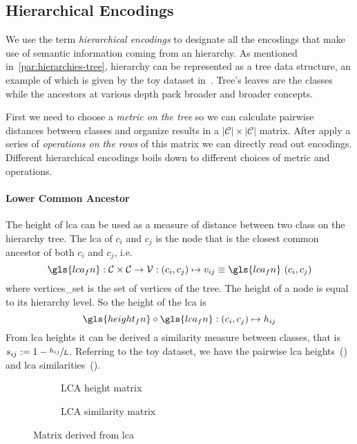\subsection{Hierarchical Encodings}
\label{subsec:hierarchical-encodings}
We use the term \emph{hierarchical encodings} to designate all the encodings
that make use of semantic information coming from an hierarchy. As mentioned
in~\cref{par:hierarchies-tree}, hierarchy can be represented as a tree data
structure, an example of which is given by the toy dataset
in~. Tree's leaves are the classes while the ancestors
at various depth pack broader and broader concepts.

First we need to choose a \emph{metric on the tree} so we can calculate
pairwise distances between classes and organize results in a $|\mathcal{C}|
\times |\mathcal{C}|$ matrix. After apply a series of \emph{operations on the
rows} of this matrix we can directly read out encodings. Different hierarchical
encodings boils down to different choices of metric and operations.

\paragraph{Lower Common Ancestor}
The height of \acrfull{lca} can be used as a measure of distance between two
class on the hierarchy tree. The \acrshort{lca} of $c_i$ and $c_j$ is the node
that is the closest common ancestor of both $c_i$ and $c_j$, i.e.
\begin{equation}
  \gls{lca_fn} : \mathcal{C} \times \mathcal{C} \to \mathcal{V}:
  \left(c_i, c_j\right) \mapsto v_{ij} \equiv
  \gls{lca_fn} \, \left(c_i, c_j\right)
  \label{eq:lca}
\end{equation}
where \gls{vertices_set} is the set of vertices of the tree. The height of a
node is equal to its hierarchy level. So the height of the \acrshort{lca} is
\begin{equation}
  \gls{height_fn} \circ \gls{lca_fn} : \left(c_i, c_j\right) \mapsto h_{ij}
  \label{eq:lca-height}
\end{equation}
From \acrshort{lca} heights it can be derived a similarity measure between
classes, that is $s_{ij} := 1 - \sfrac{h_{ij}}{L}$. Referring to the toy
dataset, we have the pairwise lca heights~() and
lca similarities~().
\begin{figure}[htbp]
  \begin{subfigure}{0.45\textwidth}
    \caption{LCA height matrix}
    \label{fig:lca-height-matrix}
  \end{subfigure}
  \begin{subfigure}{0.45\textwidth}
    \caption{LCA similarity matrix}
    \label{fig:lca-similarity-matrix}
  \end{subfigure}
  \caption{Matrix derived from \acrlong{lca}}
\end{figure}

